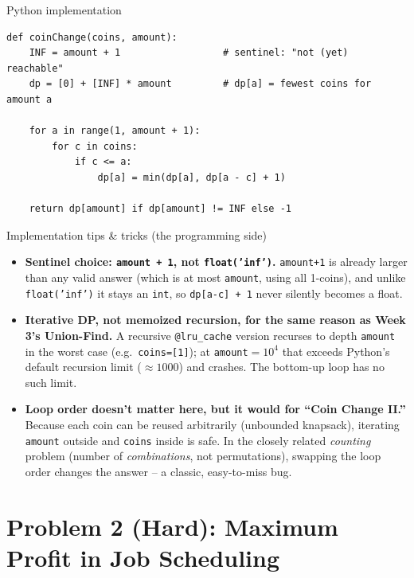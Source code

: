 \documentclass[11pt,aspectratio=169]{beamer}
\begin{document}
\begin{frame}[fragile]{Python implementation}
  \begin{lstlisting}[style=py]
def coinChange(coins, amount):
    INF = amount + 1                  # sentinel: "not (yet) reachable"
    dp = [0] + [INF] * amount         # dp[a] = fewest coins for amount a

    for a in range(1, amount + 1):
        for c in coins:
            if c <= a:
                dp[a] = min(dp[a], dp[a - c] + 1)

    return dp[amount] if dp[amount] != INF else -1
  \end{lstlisting}
\end{frame}

\begin{frame}{Implementation tips \& tricks (the programming side)}
  \small
  \begin{itemize}
    \item \textbf{Sentinel choice: \texttt{amount + 1}, not \texttt{float('inf')}.}
    \texttt{amount+1} is already larger than any valid answer (which is at most
    \texttt{amount}, using all 1-coins), and unlike \texttt{float('inf')} it stays an
    \texttt{int}, so \texttt{dp[a-c] + 1} never silently becomes a float.
    \item \textbf{Iterative DP, not memoized recursion, for the same reason as
    Week 3's Union-Find.} A recursive \texttt{@lru\_cache} version recurses to depth
    \texttt{amount} in the worst case (e.g.\ \texttt{coins=[1]}); at
    \texttt{amount}$=10^4$ that exceeds Python's default recursion limit
    ($\approx 1000$) and crashes. The bottom-up loop has no such limit.
    \item \textbf{Loop order doesn't matter here, but it would for ``Coin Change II.''}
    Because each coin can be reused arbitrarily (unbounded knapsack), iterating
    \texttt{amount} outside and \texttt{coins} inside is safe. In the closely related
    \emph{counting} problem (number of \emph{combinations}, not permutations), swapping
    the loop order changes the answer -- a classic, easy-to-miss bug.
  \end{itemize}
\end{frame}

\section{Problem 2 (Hard): Maximum Profit in Job Scheduling}
\end{document}
